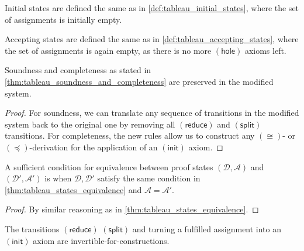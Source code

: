 \documentclass[twoside]{report}
\begin{document}
\begin{definition}
    \label{def:tableau_initial_states_with_constraints}
    Initial states are defined the same as in \cref{def:tableau_initial_states}, where the set of assignments is initially empty.
\end{definition}

\begin{definition}
    \label{def:tableau_accepting_states_with_constraints}
    Accepting states are defined the same as in \cref{def:tableau_accepting_states}, where the set of assignments is again empty, as there is no more $(\mathsf{hole})$ axioms left.
\end{definition}

\begin{proposition}
    \label{thm:tableau_soundness_and_completeness_with_constraints}
    Soundness and completeness as stated in \cref{thm:tableau_soundness_and_completeness} are preserved in the modified system.
\end{proposition}

\begin{proof}
    For soundness, we can translate any sequence of transitions in the modified system back to the original one by removing all $(\mathsf{reduce})$ and $(\mathsf{split})$ transitions. For completeness, the new rules allow us to construct any $(\cong)$- or $(\preceq)$-derivation for the application of an $(\mathsf{init})$ axiom.
\end{proof}

\begin{proposition}
    \label{thm:tableau_states_equivalence_with_constraints}
    A sufficient condition for equivalence between proof states $(\mathcal D, \mathcal A)$ and $(\mathcal D', \mathcal A')$ is when $\mathcal D, \mathcal D'$ satisfy the same condition in \cref{thm:tableau_states_equivalence} and $\mathcal A = \mathcal A'$.
\end{proposition}

\begin{proof}
    By similar reasoning as in \cref{thm:tableau_states_equivalence}.
\end{proof}

\begin{proposition}
    \label{thm:tableau_transitions_invertibility_with_constraints}
    The transitions $(\mathsf{reduce})$ $(\mathsf{split})$ and turning a fulfilled assignment into an $(\mathsf{init})$ axiom are invertible-for-constructions.
\end{proposition}
\end{document}
